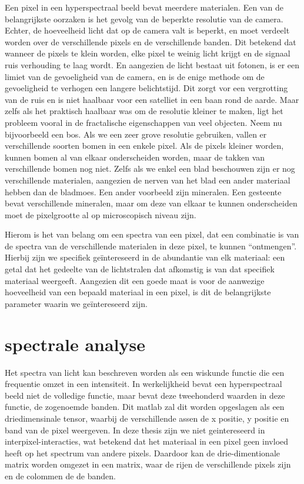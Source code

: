 \documentclass[12pt]{report}
\begin{document}
Een pixel in een hyperspectraal beeld bevat meerdere materialen. Een van de belangrijkste oorzaken is het gevolg van de beperkte resolutie van de camera. Echter, de hoeveelheid licht dat op de camera valt is beperkt, en moet verdeelt worden over de verschillende pixels en de verschillende banden. Dit betekend dat wanneer de pixels te klein worden, elke pixel te weinig licht krijgt en de signaal ruis verhouding te laag wordt. En aangezien de licht bestaat uit fotonen, is er een limiet van de gevoeligheid van de camera, en is de enige methode om de gevoeligheid te verhogen een langere belichtstijd. Dit zorgt vor een vergrotting van de ruis en is niet haalbaar voor een satelliet in een baan rond de aarde. Maar zelfs als het praktisch haalbaar was om de resolutie kleiner te maken, ligt het probleem vooral in de fractalische eigenschappen van veel objecten. Neem nu bijvoorbeeld een bos. Als we een zeer grove resolutie gebruiken, vallen er verschillende soorten bomen in een enkele pixel. Als de pixels kleiner worden, kunnen bomen al van elkaar onderscheiden worden, maar de takken van verschillende bomen nog niet. Zelfs als we enkel een blad beschouwen zijn er nog verschillende materialen, aangezien de nerven van het blad een ander materiaal hebben dan de bladmoes. Een ander voorbeeld zijn mineralen. Een gesteente bevat verschillende mineralen, maar om deze van elkaar te kunnen onderscheiden moet de pixelgrootte al op microscopisch niveau zijn. 

Hierom is het van belang om een spectra van een pixel, dat een combinatie is van de spectra van de verschillende materialen in deze pixel, te kunnen ``ontmengen''. Hierbij zijn we specifiek ge\"intereseerd in de abundantie van elk materiaal: een getal dat het gedeelte van de lichtstralen dat afkomstig is van dat specifiek materiaal weergeeft. Aangezien dit een goede maat is voor de aanwezige hoeveelheid van een bepaald materiaal in een pixel, is dit de belangrijkste parameter waarin we ge\"intereseerd zijn.


\section{spectrale analyse}


Het spectra van licht kan beschreven worden als een wiskunde functie die een frequentie omzet in een intensiteit. In werkelijkheid bevat een hyperspectraal beeld niet de volledige functie, maar bevat deze tweehonderd waarden in deze functie, de zogenoemde banden. Dit matlab\citep{MATLAB} zal dit worden opgeslagen als een driedimensinale tensor, waarbij de verschillende assen de x positie, y positie en band van de pixel weergeven. In deze thesis zijn we niet geintereseerd in  interpixel-interacties, wat betekend dat het materiaal in een pixel geen invloed heeft op het spectrum van andere pixels. Daardoor kan de drie-dimentionale matrix worden omgezet in een matrix, waar de rijen de verschillende pixels zijn en de colommen de de banden.  
\end{document}
